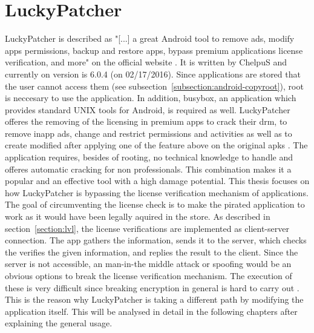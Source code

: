 \section{LuckyPatcher} \label{section:luckypatcher-explain}
LuckyPatcher is described as "[...] a great Android tool to remove ads, modify apps permissions, backup and restore apps, bypass premium applications license verification, and more" on the official website \cite{luckyPatcherOfficial}.
It is written by ChelpuS and currently on version is 6.0.4 (on 02/17/2016).
Since applications are stored that the user cannot access them (see subsection~\ref{subsection:android-copyroot}), root is neccesary to use the application.
In addition, busybox, an application which provides standard UNIX tools for Android\cite{busyboxApp}, is required as well.
\newline
LuckyPatcher offeres the removing of the licensing in premium apps to crack their \gls{drm}, to remove inapp ads, change and restrict permissions and activities as well as to create modified after applying one of the feature above on the original \gls{apk}s \cite{luckyPatcherOfficial}.
\newline
The application requires, besides of rooting, no technical knowledge to handle and offeres automatic cracking for non professionals.
This combination makes it a popular and an effective tool with a high damage potential. \cite{munteanLicense}
\newline
This thesis focuses on how LuckyPatcher is bypassing the license verification mechanism of applications.
The goal of circumventing the license check is to make the pirated application to work as it would have been legally aquired in the store.
As described in section~\ref{section:lvl}, the license verifications are implemented as client-server connection.
The app gathers the information, sends it to the server, which checks the verifies the given information, and replies the result to the client.
Since the server is not accessible, an man-in-the middle attack or spoofing would be an obvious options to break the license verification mechanism.
The execution of these is very difficult since breaking encryption in general is hard to carry out \cite{munteanLicense}.
This is the reason why LuckyPatcher is taking a different path by modifying the application itself. This will be analysed in detail in the following chapters after explaining the general usage.
\newline
